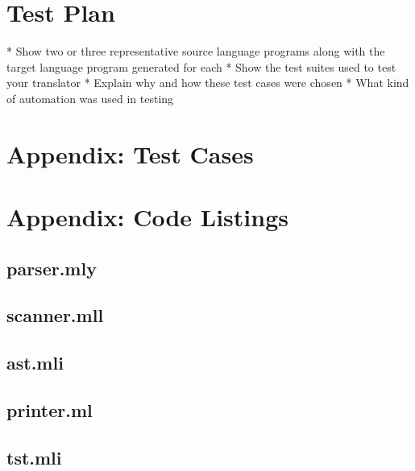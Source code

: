 \documentclass[onecolumn,titlepage]{article}
\begin{document}
\section{Test Plan}

    * Show two or three representative source language programs along with the target language program generated for each
    * Show the test suites used to test your translator
    * Explain why and how these test cases were chosen
    * What kind of automation was used in testing

\singlespace
\appendix
\section{Appendix: Test Cases}


\section{Appendix: Code Listings}

\subsection{parser.mly}
\lstset{caption=C$\mu$LOG Parser,label=parser}


\subsection{scanner.mll}
\lstset{caption=C$\mu$LOG Scanner,label=scanner}


\subsection{ast.mli}
\lstset{language=Caml,caption=C$\mu$LOG AST,label=ast}


\subsection{printer.ml}
\lstset{language=Caml,caption=C$\mu$LOG AST Printer,label=printer}


\subsection{tst.mli}
\lstset{language=Caml,caption=C$\mu$LOG Translated Syntax Tree,label=tst}

\end{document}
